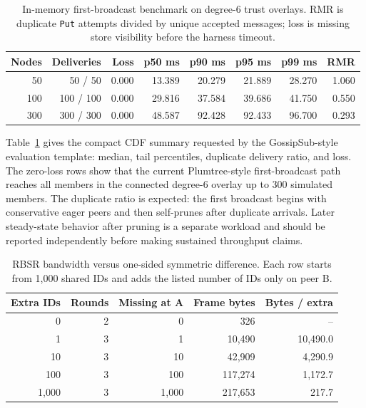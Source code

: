 \documentclass[11pt,a4paper,twocolumn]{article}
\begin{document}
\begin{table}[t]
\centering
\small
\caption{In-memory first-broadcast benchmark on degree-6 trust overlays.
RMR is duplicate \texttt{Put} attempts divided by unique accepted messages;
loss is missing store visibility before the harness timeout.}
\label{tab:lab-broadcast}
\begin{tabular}{rrrrrrrr}
\toprule
Nodes & Deliveries & Loss & p50 ms & p90 ms & p95 ms & p99 ms & RMR \\
\midrule
50 & 50 / 50 & 0.000 & 13.389 & 20.279 & 21.889 & 28.270 & 1.060 \\
100 & 100 / 100 & 0.000 & 29.816 & 37.584 & 39.686 & 41.750 & 0.550 \\
300 & 300 / 300 & 0.000 & 48.587 & 92.428 & 92.433 & 96.700 & 0.293 \\
\bottomrule
\end{tabular}
\end{table}

Table~\ref{tab:lab-broadcast} gives the compact CDF summary requested by the
GossipSub-style evaluation template: median, tail percentiles, duplicate
delivery ratio, and loss. The zero-loss rows show that the current
Plumtree-style first-broadcast path reaches all members in the connected
degree-6 overlay up to 300 simulated members. The duplicate ratio is expected:
the first broadcast begins with conservative eager peers and then self-prunes
after duplicate arrivals. Later steady-state behavior after pruning is a
separate workload and should be reported independently before making sustained
throughput claims.

\begin{table}[t]
\centering
\small
\caption{RBSR bandwidth versus one-sided symmetric difference. Each row starts
from 1,000 shared IDs and adds the listed number of IDs only on peer B.}
\label{tab:lab-rbsr}
\begin{tabular}{rrrrr}
\toprule
Extra IDs & Rounds & Missing at A & Frame bytes & Bytes / extra \\
\midrule
0 & 2 & 0 & 326 & -- \\
1 & 3 & 1 & 10,490 & 10,490.0 \\
10 & 3 & 10 & 42,909 & 4,290.9 \\
100 & 3 & 100 & 117,274 & 1,172.7 \\
1,000 & 3 & 1,000 & 217,653 & 217.7 \\
\bottomrule
\end{tabular}
\end{table}
\end{document}

